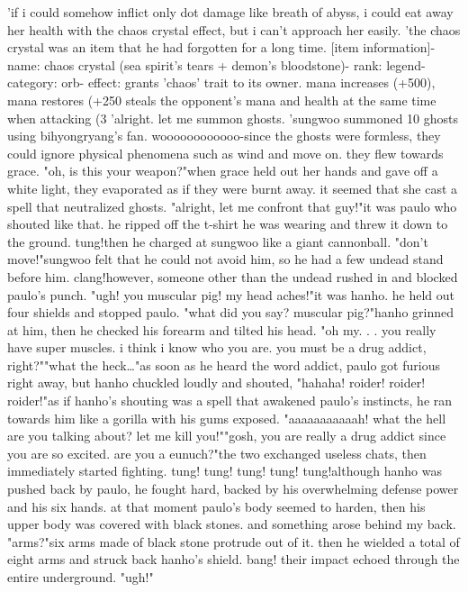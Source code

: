 'if i could somehow inflict only dot damage like breath of abyss, i could eat away her health with the chaos crystal effect, but i can't approach her easily.
'the chaos crystal was an item that he had forgotten for a long time.
[item information]- name: chaos crystal (sea spirit's tears + demon's bloodstone)- rank: legend- category: orb- effect: grants 'chaos' trait to its owner.
 mana increases (+500), mana restores (+250%
 steals the opponent's mana and health at the same time when attacking (3%
 'alright.
 let me summon ghosts.
'sungwoo summoned 10 ghosts using bihyongryang's fan.
 woooooooooooo-since the ghosts were formless, they could ignore physical phenomena such as wind and move on.
 they flew towards grace.
"oh, is this your weapon?"when grace held out her hands and gave off a white light, they evaporated as if they were burnt away.
 it seemed that she cast a spell that neutralized ghosts.
"alright, let me confront that guy!"it was paulo who shouted like that.
 he ripped off the t-shirt he was wearing and threw it down to the ground.
tung!then he charged at sungwoo like a giant cannonball.
"don't move!"sungwoo felt that he could not avoid him, so he had a few undead stand before him.
clang!however, someone other than the undead rushed in and blocked paulo's punch.
"ugh! you muscular pig! my head aches!"it was hanho.
 he held out four shields and stopped paulo.
"what did you say? muscular pig?"hanho grinned at him, then he checked his forearm and tilted his head.
"oh my.
.
.
you really have super muscles.
 i think i know who you are.
 you must be a drug addict, right?""what the heck…"as soon as he heard the word addict, paulo got furious right away, but hanho chuckled loudly and shouted, "hahaha! roider! roider! roider!"as if hanho's shouting was a spell that awakened paulo's instincts, he ran towards him like a gorilla with his gums exposed.
"aaaaaaaaaaah! what the hell are you talking about? let me kill you!""gosh, you are really a drug addict since you are so excited.
 are you a eunuch?"the two exchanged useless chats, then immediately started fighting.
tung! tung! tung! tung! tung!although hanho was pushed back by paulo, he fought hard, backed by his overwhelming defense power and his six hands.
at that moment paulo's body seemed to harden, then his upper body was covered with black stones.
 and something arose behind my back.
"arms?"six arms made of black stone protrude out of it.
then he wielded a total of eight arms and struck back hanho's shield.
bang! their impact echoed through the entire underground.
"ugh!"

